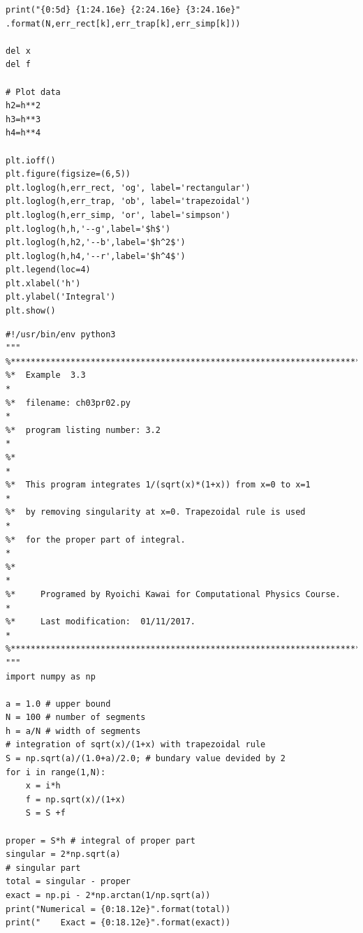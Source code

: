 \begin{verbatim}
print("{0:5d} {1:24.16e} {2:24.16e} {3:24.16e}"
.format(N,err_rect[k],err_trap[k],err_simp[k]))

del x
del f

# Plot data
h2=h**2
h3=h**3
h4=h**4

plt.ioff()
plt.figure(figsize=(6,5))
plt.loglog(h,err_rect, 'og', label='rectangular')
plt.loglog(h,err_trap, 'ob', label='trapezoidal')
plt.loglog(h,err_simp, 'or', label='simpson')
plt.loglog(h,h,'--g',label='$h$')
plt.loglog(h,h2,'--b',label='$h^2$')
plt.loglog(h,h4,'--r',label='$h^4$')
plt.legend(loc=4)
plt.xlabel('h')
plt.ylabel('Integral')
plt.show()
\end{verbatim}

\normalsize


\bigskip
\noindent
\program
\label{python:improper_int}
\footnotesize
\begin{verbatim}
#!/usr/bin/env python3
"""
%**************************************************************************
%*  Example  3.3                                                          *
%*  filename: ch03pr02.py                                                 *
%*  program listing number: 3.2                                           *
%*                                                                        *
%*  This program integrates 1/(sqrt(x)*(1+x)) from x=0 to x=1             *
%*  by removing singularity at x=0. Trapezoidal rule is used              *
%*  for the proper part of integral.                                      *
%*                                                                        *
%*     Programed by Ryoichi Kawai for Computational Physics Course.       *
%*     Last modification:  01/11/2017.                                    *
%**************************************************************************
"""
import numpy as np

a = 1.0 # upper bound
N = 100 # number of segments
h = a/N # width of segments
# integration of sqrt(x)/(1+x) with trapezoidal rule
S = np.sqrt(a)/(1.0+a)/2.0; # bundary value devided by 2
for i in range(1,N):
    x = i*h
    f = np.sqrt(x)/(1+x)
    S = S +f

proper = S*h # integral of proper part
singular = 2*np.sqrt(a)
# singular part
total = singular - proper
exact = np.pi - 2*np.arctan(1/np.sqrt(a))
print("Numerical = {0:18.12e}".format(total))
print("    Exact = {0:18.12e}".format(exact))
\end{verbatim}

\normalsize

